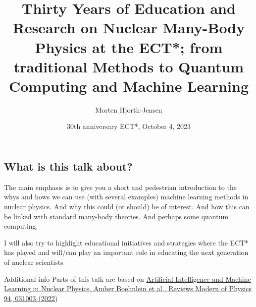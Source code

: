 \documentclass[%
oneside,                 %
final,                   %
10pt]{article}
\begin{document}

\newcommand{\exercisesection}[1]{\subsection*{#1}}






\title{Thirty Years of Education and Research on Nuclear Many-Body Physics at the ECT*; from traditional Methods to Quantum Computing and Machine Learning}


\author{Morten Hjorth-Jensen}

\date{30th anniversary ECT*, October 4, 2023
}

\subsection{What is this talk about?}
\begin{block}{}
The main emphasis is to give you a short and pedestrian introduction to the whys and hows we can use (with several examples) machine learning methods
in nuclear physics. And why this could (or should) be of interest. And how this can be linked with standard many-body theories. And perhaps some quantum computing.
\end{block}

\begin{block}{}
I will also try to highlight educational initiatives and strategies where the ECT* has played and will/can play an important role in educating the next generation of nuclear scientists
\end{block}

\begin{block}{Additional info }
Parts of this talk are based on \href{{https://journals.aps.org/rmp/abstract/10.1103/RevModPhys.94.031003}}{Artificial Intelligence and Machine Learning in Nuclear Physics, Amber Boehnlein et al., Reviews Modern of Physics 94, 031003 (2022)} 

\end{block}
\end{document}
